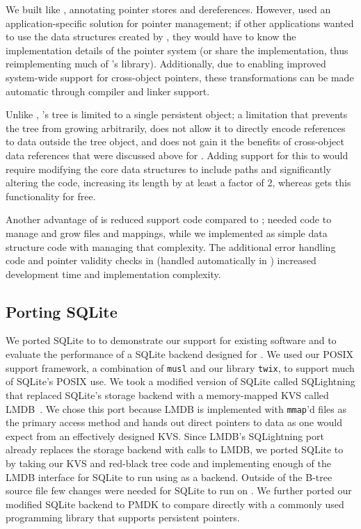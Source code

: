 We built \nvrbt like \unixrbt, annotating pointer stores and
dereferences. However, \unixrbt used an application-specific solution for pointer
management; if other applications wanted to use the data structures created by \unixrbt, they would
have to know the implementation details of the pointer system (or share the implementation, thus
reimplementing much of \Twizzler's library).  Additionally, due to \Twizzler enabling improved
system-wide support for cross-object pointers, these transformations can be made automatic through
compiler and linker support.

Unlike \nvrbt, \unixrbt's tree is limited to a single persistent
object; a limitation that prevents the tree from growing arbitrarily, does not
allow it to directly encode references to data outside the tree object, and does
not gain it the benefits of cross-object data references that were discussed
above for \nvkv. Adding support for this to \unixrbt would require modifying the
core data structures to include paths and significantly altering the code,
increasing its length by at least a factor of 2, whereas \nvrbt gets this
functionality for free.

Another advantage of \nvrbt is reduced support code compared to \unixrbt; \unixrbt needed
code to manage and grow files and mappings, while we implemented \nvrbt as simple data structure code
with \Twizzler managing that complexity. The additional error handling code and pointer
validity checks in \unixrbt (handled automatically in \Twizzler) increased development time
and implementation complexity.


\subsection{Porting SQLite}

We ported SQLite to \Twizzler to demonstrate our support for existing software and to evaluate the
performance of a SQLite backend designed for \Twizzler. We used
our POSIX support framework, a combination of \texttt{musl} and our library
\texttt{twix}, to support much of SQLite's POSIX use.
We took a modified version of SQLite called SQLightning that replaced
SQLite's storage backend with a memory-mapped KVS called LMDB~\cite{lmdb}.
We chose this port
because LMDB is implemented with \texttt{mmap}'d files as the primary access method and hands out
direct pointers to data as one would expect from an effectively designed \NVM KVS.
Since LMDB's SQLightning port already replaces the storage backend
with calls to
LMDB, we ported SQLite to \Twizzler by taking our KVS and red-black tree code and implementing
enough of the LMDB interface for SQLite to run using \Twizzler as a backend.
Outside of the
B-tree source file few changes were needed for
SQLite to run on \Twizzler. We further ported our modified SQLite backend to PMDK to compare
directly with a commonly used \NVM programming library that supports persistent pointers.

